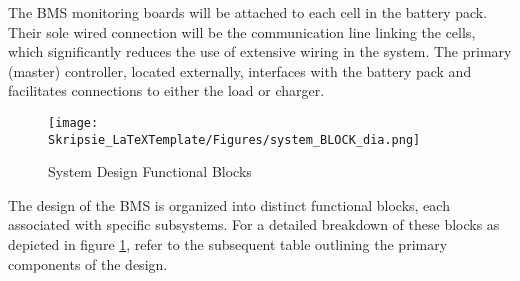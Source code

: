 \noindent
The BMS monitoring boards will be attached to each cell in the battery pack. Their sole wired connection will be the communication line linking the cells, which significantly reduces the use of extensive wiring in the system. The primary (master) controller, located externally, interfaces with the battery pack and facilitates connections to either the load or charger.
\newpage
\begin{figure}[h!]
\centering
\texttt{[image: Skripsie\_LaTeXTemplate/Figures/system\_BLOCK\_dia.png]}
\caption{System Design Functional Blocks}
\label{fig:systOVV_Diagram}
\end{figure}
\noindent
The design of the BMS is organized into distinct functional blocks, each associated with specific subsystems. For a detailed breakdown of these blocks as depicted in figure \ref{fig:systOVV_Diagram}, refer to the subsequent table outlining the primary components of the design.
